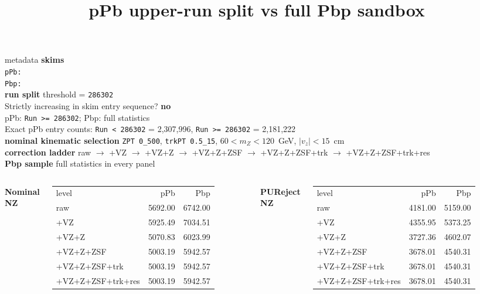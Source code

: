\documentclass[aspectratio=169]{beamer}
\title{pPb upper-run split vs full Pbp sandbox}
\date{}
\begin{document}
\begin{frame}
  \titlepage
\end{frame}

\begin{frame}[t]{metadata}
  \tiny
  \textbf{skims}\\
  \texttt{pPb: }\\
  \texttt{Pbp: }\\
  \vspace{0.35em}
  \textbf{run split} threshold = \texttt{286302}\\
  Strictly increasing in skim entry sequence? \textbf{no}\\
  pPb: \texttt{Run >= 286302}; Pbp: full statistics\\
  Exact pPb entry counts: \texttt{Run < 286302} = 2,307,996, \texttt{Run >= 286302} = 2,181,222\\
  \vspace{0.35em}
  \textbf{nominal kinematic selection} \texttt{ZPT 0\_500}, \texttt{trkPT 0.5\_15}, $60 < m_Z < 120$~GeV, $|v_z| < 15$~cm\\
  \textbf{correction ladder} raw $\to$ +VZ $\to$ +VZ+Z $\to$ +VZ+Z+ZSF $\to$ +VZ+Z+ZSF+trk $\to$ +VZ+Z+ZSF+trk+res\\
  \textbf{Pbp sample} full statistics in every panel\\
  \vspace{0.4em}
  \begin{columns}[t,onlytextwidth]
    \centering
    \textbf{Nominal NZ}\\[-0.2em]
    \scriptsize
    \begin{tabular}{lrr}
      level & pPb & Pbp \\
raw & 5692.00 & 6742.00 \\
+VZ & 5925.49 & 7034.51 \\
+VZ+Z & 5070.83 & 6023.99 \\
+VZ+Z+ZSF & 5003.19 & 5942.57 \\
+VZ+Z+ZSF+trk & 5003.19 & 5942.57 \\
+VZ+Z+ZSF+trk+res & 5003.19 & 5942.57 \\
    \end{tabular}
    \centering
    \textbf{PUReject NZ}\\[-0.2em]
    \scriptsize
    \begin{tabular}{lrr}
      level & pPb & Pbp \\
raw & 4181.00 & 5159.00 \\
+VZ & 4355.95 & 5373.25 \\
+VZ+Z & 3727.36 & 4602.07 \\
+VZ+Z+ZSF & 3678.01 & 4540.31 \\
+VZ+Z+ZSF+trk & 3678.01 & 4540.31 \\
+VZ+Z+ZSF+trk+res & 3678.01 & 4540.31 \\
    \end{tabular}
  \end{columns}
\end{frame}
\end{document}
